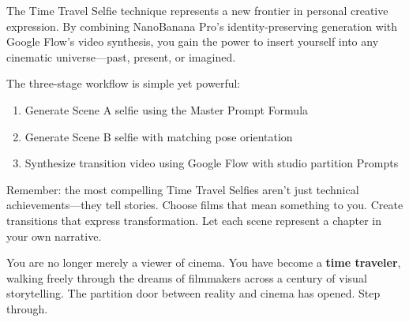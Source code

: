 The Time Travel Selfie technique represents a new frontier in personal creative expression. By combining NanoBanana Pro's identity-preserving generation with Google Flow's video synthesis, you gain the power to insert yourself into any cinematic universe—past, present, or imagined.

The three-stage workflow is simple yet powerful:

\begin{enumerate}
\item Generate Scene A selfie using the Master Prompt Formula
\item Generate Scene B selfie with matching pose orientation
\item Synthesize transition video using Google Flow with studio partition Prompts
\end{enumerate}

Remember: the most compelling Time Travel Selfies aren't just technical achievements—they tell stories. Choose films that mean something to you. Create transitions that express transformation. Let each scene represent a chapter in your own narrative.

You are no longer merely a viewer of cinema. You have become a \textbf{time traveler}, walking freely through the dreams of filmmakers across a century of visual storytelling. The partition door between reality and cinema has opened. Step through.


